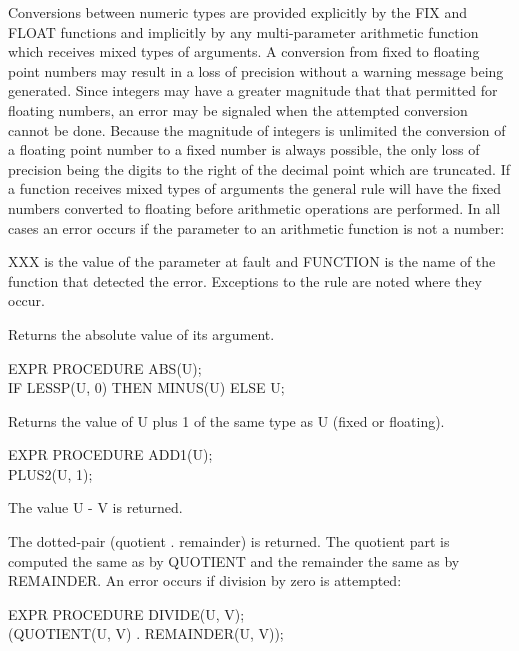 Conversions between numeric types are provided explicitly by the
 
FIX and FLOAT functions and implicitly by any multi-parameter
arithmetic function which receives mixed types of arguments. A
conversion from fixed to floating point numbers may result in a loss
of precision without a warning message being generated. Since
integers may have a greater magnitude that that permitted for floating
numbers, an error may be signaled when the attempted conversion cannot
be done. Because the magnitude of integers is unlimited the conversion
of a floating point number to a fixed number is always possible, the
only loss of precision being the digits to the right of the decimal
point which are truncated. If a function receives mixed types of
arguments the general rule will have the fixed numbers converted to
floating before arithmetic operations are performed. In all cases an
error occurs if the parameter to an arithmetic function is not a
number:


XXX is the value of the parameter at fault and FUNCTION is the name of
the function that detected the error. Exceptions to the rule are noted
where they occur.




{Returns the absolute value of its argument.

{\tt \begin{tabbing} EXPR PROCEDURE ABS(U); \\
\hspace*{1em} IF LESSP(U, 0) THEN MINUS(U) ELSE U;
\end{tabbing}}}

{Returns the value of U plus 1 of the same type as U (fixed or
floating).

{\tt \begin{tabbing} EXPR PROCEDURE ADD1(U); \\
\hspace{1em} PLUS2(U, 1);
\end{tabbing}}
}

{The value U - V is returned.}


{The dotted-pair (quotient . remainder) is returned. The quotient part
is computed the same as by QUOTIENT and the remainder the same as by
REMAINDER. An error occurs if division by zero is attempted:


{\tt \begin{tabbing} EXPR PROCEDURE DIVIDE(U, V); \\
\hspace*{1em} (QUOTIENT(U, V) . REMAINDER(U, V));
\end{tabbing}}}


